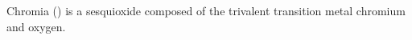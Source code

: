 Chromia () is a sesquioxide composed of the trivalent transition metal chromium and oxygen.
\cite{lebreau2014}